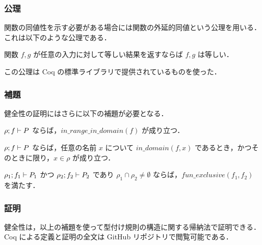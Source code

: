 \subsubsection{公理}

関数の同値性を示す必要がある場合には関数の外延的同値という公理を用いる．これは以下のような公理である．

\begin{axm}[関数の外延的同値]
  関数 $ f, g $ が任意の入力に対して等しい結果を返すならば $ f, g $ は等しい．
\end{axm}

この公理は Coq の標準ライブラリで提供されているものを使った．%




\subsubsection{補題}

健全性の証明にはさらに以下の補題が必要となる．

\begin{lem}[定義域と値域の一致]
  \label{lemma:typing_range_domain}
  $\rho ; f \vdash P$ ならば，$in\_range\_in\_domain(f)$ が成り立つ．
\end{lem}

\begin{lem}
  \label{lemma:typing_recep_domain}
  $\rho ; f \vdash P$ ならば，任意の名前 $ x $ について $in\_domain(f, x) $ であるとき，かつそのときに限り，$ x \in \rho $ が成り立つ．
\end{lem}

\begin{lem}
  \label{lemma:typing_fun_exclusive}
  $\rho_1 ; f_1 \vdash P_1$ かつ $\rho_2 ; f_2 \vdash P_2$ であり $ \rho_1 \cap \rho_2 \neq \emptyset $ ならば，$fun\_exclusive(f_1, f_2)$ を満たす．
\end{lem}

\subsubsection{証明}

健全性は，以上の補題を使って型付け規則の構造に関する帰納法で証明できる．Coq による定義と証明の全文は GitHub リポジトリ\cite[api]{api}で閲覧可能である．

